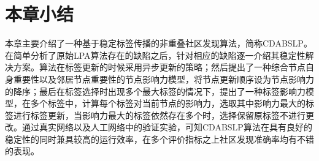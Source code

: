 \section{本章小结}

本章主要介绍了一种基于稳定标签传播的非重叠社区发现算法，简称CDABSLP。在简单分析了原始LPA算法存在的缺陷之后，针对相应的缺陷逐一介绍其稳定性解决方案。算法在标签更新的时候采用异步更新的策略；然后提出了一种综合节点自身重要性以及邻居节点重要性的节点影响力模型，将节点更新顺序设为节点影响力的降序；最后在标签选择时出现多个最大标签的情况下，提出了一种标签影响力模型，在多个标签中，计算每个标签对当前节点的影响力，选取其中影响力最大的标签进行标签更新，当影响力最大的标签依然存在多个时，选择保留原标签不进行更改。通过真实网络以及人工网络中的验证实验，可知CDABSLP算法在具有良好的稳定性的同时兼具较高的运行效率，在多个评价指标之上社区发现准确率均有不错的表现。
